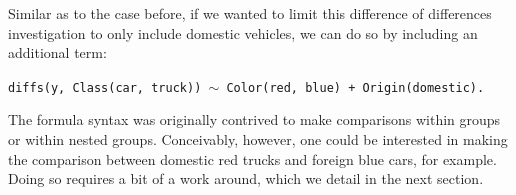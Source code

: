 \documentclass{article}
\newcommand{\xt}{\texttt}%
\begin{document}
Similar as to the case before, if we wanted to limit this difference of differences investigation to only include domestic vehicles, we can do so by including an additional term:

\begin{center}
\tt diffs(y, Class(car, truck)) $\sim$ Color(red, blue) + Origin(domestic).
\end{center}

The formula syntax was originally contrived to make comparisons within groups or within nested groups. Conceivably, however, one could be interested in making the comparison between domestic red trucks and foreign blue cars, for example. Doing so requires a bit of a work around, which we detail in the next section.
%
%
%
%
%
%
%
%
%
\end{document}
